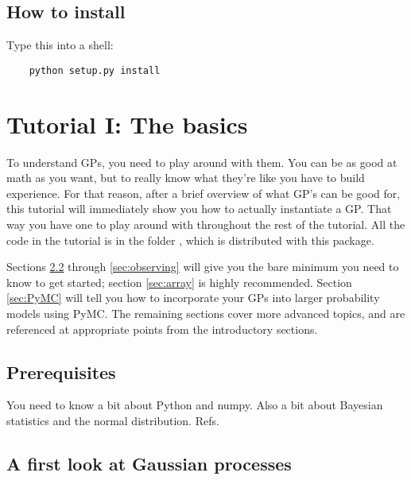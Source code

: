 \documentclass{manual}
\begin{document}
\section{How to install}\label{sec:installing}

Type this into a shell:
\begin{verbatim}
	python setup.py install
\end{verbatim}




\chapter{Tutorial I: The basics}\label{cha:basics} %


To understand GPs, you need to play around with them. You can be as good at math as you want, but to really know what they're like you have to build experience. For that reason, after a brief overview of what GP's can be good for, this tutorial will immediately show you how to actually instantiate a GP. That way you have one to play around with throughout the rest of the tutorial. All the code in the tutorial is in the folder , which is distributed with this package.

Sections \ref{sec:firstlook} through \ref{sec:observing} will give you the bare minimum you need to know to get started; section \ref{sec:array} is highly recommended. Section \ref{sec:PyMC} will tell you how to incorporate your GPs into larger probability models using PyMC. The remaining sections cover more advanced topics, and are referenced at appropriate points from the introductory sections.

\section{Prerequisites}\label{sec:prerequisites}
You need to know a bit about Python and numpy. Also a bit about Bayesian statistics and the normal distribution. Refs. 

\section{A first look at Gaussian processes}\label{sec:firstlook} %
\end{document}
